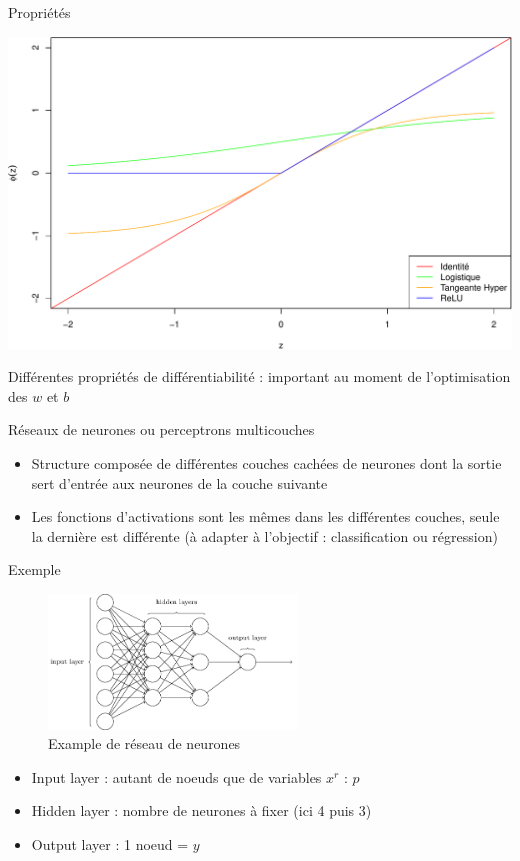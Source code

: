 \documentclass[ignorenonframetext,]{beamer}
\providecommand{\tightlist}{%
  \setlength{\itemsep}{0pt}\setlength{\parskip}{0pt}}
\begin{document}
\begin{frame}{Propriétés}

\includegraphics{cours_deeplearning_for_dummies_files/figure-beamer/unnamed-chunk-1-1.pdf}

Différentes propriétés de différentiabilité : important au moment de
l'optimisation des \(w\) et \(b\)

\end{frame}

\begin{frame}{Réseaux de neurones ou perceptrons multicouches}

\begin{itemize}
\tightlist
\item
  Structure composée de différentes couches cachées de neurones dont la
  sortie sert d'entrée aux neurones de la couche suivante
\item
  Les fonctions d'activations sont les mêmes dans les différentes
  couches, seule la dernière est différente (à adapter à l'objectif :
  classification ou régression)
\end{itemize}

\end{frame}

\begin{frame}{Exemple}

\begin{figure}
\centering
\includegraphics[width=2.60417in]{mlp-network.png}
\caption{Example de réseau de neurones}
\end{figure}

\begin{itemize}
\tightlist
\item
  Input layer : autant de noeuds que de variables \(x^r\) : \(p\)
\item
  Hidden layer : nombre de neurones à fixer (ici 4 puis 3)
\item
  Output layer : 1 noeud = \(y\)
\end{itemize}

\end{frame}
\end{document}
